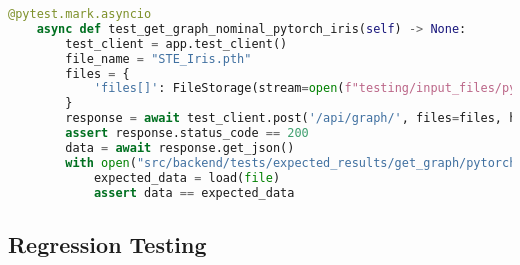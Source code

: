 \begin{center}
    \begin{lstlisting}[language=Python, float=*htb, caption={Pytest Test Case Example}, label={lst:pytest-example}]
    @pytest.mark.asyncio
    async def test_get_graph_nominal_pytorch_iris(self) -> None:
        test_client = app.test_client()
        file_name = "STE_Iris.pth"
        files = {
            'files[]': FileStorage(stream=open(f"testing/input_files/pytorch/{file_name}", 'rb'), filename=file_name)
        }
        response = await test_client.post('/api/graph/', files=files, headers={'Content-Type': 'multipart/form-data'})
        assert response.status_code == 200
        data = await response.get_json()
        with open("src/backend/tests/expected_results/get_graph/pytorch/nominal_STE_Iris.json", 'r') as file:
            expected_data = load(file)
            assert data == expected_data
    \end{lstlisting}
\end{center}

\subsection{Regression Testing}
